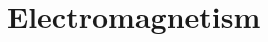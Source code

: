 \documentclass[../main]{subfiles}
\begin{document}
\section{Electromagnetism}

	\scidef{}
\end{document}
